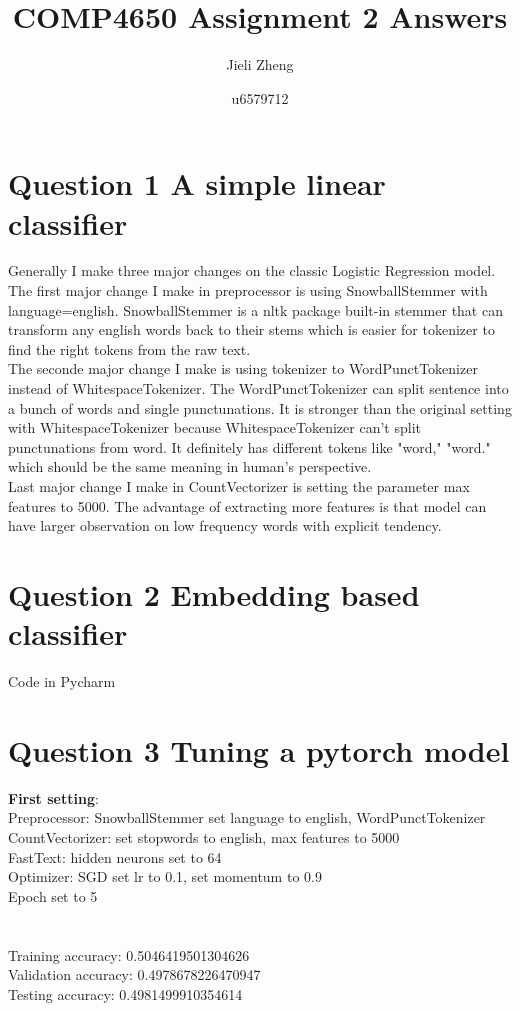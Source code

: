 \documentclass{article} %
\title{COMP4650 Assignment 2 Answers}  %
\author{Jieli Zheng}   %
\date{u6579712}
\begin{document}
\maketitle

\section*{Question 1 A simple linear classifier}
Generally I make three major changes on the classic Logistic Regression model.\\
The first major change I make in preprocessor is using SnowballStemmer with 
language=english. SnowballStemmer is a nltk package built-in stemmer that can 
transform any english words back to their stems which is easier for tokenizer 
to find the right tokens from the raw text.\\
The seconde major change I make is using tokenizer to WordPunctTokenizer instead 
of WhitespaceTokenizer. The WordPunctTokenizer can split sentence into a bunch
of words and single punctunations. It is stronger than the original setting 
with WhitespaceTokenizer because WhitespaceTokenizer can't split punctunations 
from word. It definitely has different tokens like "word," "word." which should 
be the same meaning in human's perspective.\\
Last major change I make in CountVectorizer is setting the parameter 
max features to 5000. The advantage of extracting more features is that model 
can have larger observation on low frequency words with explicit tendency. 

\section*{Question 2 Embedding based classifier}
Code in Pycharm

\section*{Question 3 Tuning a pytorch model}
\textbf{First setting}:\\
Preprocessor: SnowballStemmer set language to english, WordPunctTokenizer\\
CountVectorizer: set stopwords to english, max features to 5000\\
FastText: hidden neurons set to 64\\
Optimizer: SGD set lr to 0.1, set momentum to 0.9\\
Epoch set to 5\\
\\\\
\noindent
Training accuracy: 0.5046419501304626\\
Validation accuracy: 0.4978678226470947\\
Testing accuracy: 0.4981499910354614\\
\end{document}
